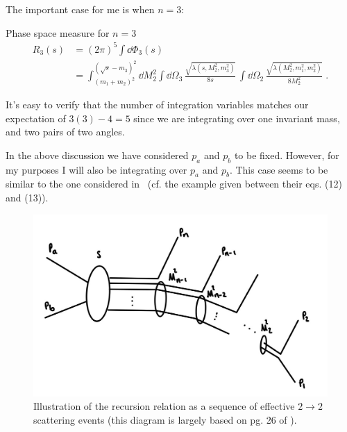 The important case for me is when $n = 3$:
\begin{bluenv}{Phase space measure for $n = 3$}
    \vspace{-3ex}
    \begin{equation}
        \label{eq:recursive-LIPS-3}
    \begin{aligned}
        R_3(s) &= (2\pi)^{5}\int \dd \Phi_3(s) \\
            &= 
            \int_{(m_1 + m_2)^2}^{(\sqrt{s} - m_3)^2} \dd M_{2}^2 
            \int \dd \Omega_3 \,
            \frac{\sqrt{\lambda (s, M^2_{2}, m_3^2)}}{8s} \,
            \int \dd \Omega_2 \,
            \frac{\sqrt{\lambda (M^2_2, m_1^2, m_2^2)}}{8 M_2^2} \; .
    \end{aligned}
    \end{equation}
\end{bluenv}
It's easy to verify that the number of integration variables matches our expectation of $3(3) - 4 = 5$ since we are integrating over one invariant mass, and two pairs of two angles. 

In the above discussion we have considered $p_a$ and $p_b$ to be fixed.
However, for my purposes I will also be integrating over $p_a$ and $p_b$.
This case seems to be similar to the one considered in~\cite{Isaacson:2021xty} (cf. the example given between their eqs. (12) and (13)).

\begin{figure}[t]
    \centering
    \includegraphics[width=0.6\linewidth]{figs/recursion-diagram.jpg}
    \caption{Illustration of the recursion relation as a sequence of effective $2 \rightarrow 2$ scattering events (this diagram is largely based on pg. 26 of \cite{James:1968gu}).}
    \label{fig:recursion-diagram}
\end{figure}

\label{subsec:momentum-transfers}


